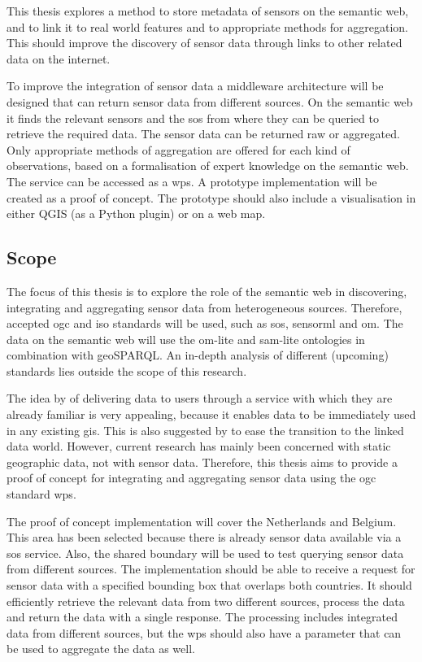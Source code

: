 This thesis explores a method to store metadata of sensors on the semantic web, and to link it to real world features and to appropriate methods for aggregation. This should improve the discovery of sensor data through links to other related data on the internet.  

To improve the integration of sensor data a middleware architecture will be designed that can return sensor data from different sources. On the semantic web it finds the relevant sensors and the \ac{sos} from where they can be queried to retrieve the required data. The sensor data can be returned raw or aggregated. Only appropriate methods of aggregation are offered for each kind of observations, based on a formalisation of expert knowledge on the semantic web. The service can be accessed as a \ac{wps}. A prototype implementation will be created as a proof of concept. The prototype should also include a visualisation in either QGIS (as a Python plugin) or on a web map. 

\subsection{Scope}
The focus of this thesis is to explore the role of the semantic web in discovering, integrating and aggregating sensor data from heterogeneous sources. Therefore, accepted \ac{ogc} and \ac{iso} standards will be used, such as \ac{sos}, \ac{sensorml} and \ac{om}. The data on the semantic web will use the om-lite and sam-lite ontologies in combination with geoSPARQL. An in-depth analysis of different (upcoming) standards lies outside the scope of this research. 

The idea by \cite{SW:Jones} of delivering data to users through a service with which they are already familiar is very appealing, because it enables data to be immediately used in any existing \ac{gis}. This is also suggested by \cite{SSW:Atkinson} to ease the transition to the linked data world. However, current research has mainly been concerned with static geographic data, not with sensor data. Therefore, this thesis aims to provide a proof of concept for integrating and aggregating sensor data using the \ac{ogc} standard \ac{wps}.

The proof of concept implementation will cover the Netherlands and Belgium. This area has been selected because there is already sensor data available via a \ac{sos} service. Also, the shared boundary will be used to test querying sensor data from different sources. The implementation should be able to receive a request for sensor data with a specified bounding box that overlaps both countries. It should efficiently retrieve the relevant data from two different sources, process the data and return the data with a single response. The processing includes integrated data from different sources, but the \ac{wps} should also have a parameter that can be used to aggregate the data as well.     





